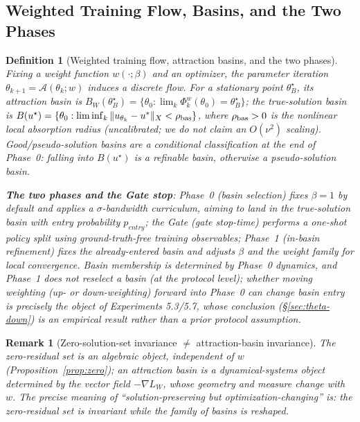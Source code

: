 \documentclass[11pt]{article}
\newcommand{\W}{W}
\newtheorem{definition}{Definition}[section]
\newtheorem*{remark}{Remark}
\numberwithin{equation}{section}
\begin{document}
\subsection{Weighted Training Flow, Basins, and the Two Phases}\label{sec:theta-flow}

\begin{definition}[Weighted training flow, attraction basins, and the two phases]\label{def:flow-basin}
Fixing a weight function $w(\cdot;\beta)$ and an optimizer, the parameter iteration $\theta_{k+1}=\mathcal A(\theta_k;w)$ induces a discrete flow. For a stationary point $\theta_B^\star$, its attraction basin is $B_{\W}(\theta_B^\star)=\{\theta_0:\lim_k\Phi_k^w(\theta_0)=\theta_B^\star\}$; the \emph{true-solution basin} is $B(u^\star)=\{\theta_0:\liminf_k\|u_{\theta_k}-u^*\|_X<\rho_{\rm bas}\}$, where $\rho_{\rm bas}>0$ is the nonlinear local absorption radius (uncalibrated; we do not claim an $O(\nu^2)$ scaling). Good/pseudo-solution basins are a conditional classification at the end of Phase~0: falling into $B(u^\star)$ is a refinable basin, otherwise a pseudo-solution basin.

\textbf{The two phases and the Gate stop}: \emph{Phase~0 (basin selection)} fixes $\beta=1$ by default and applies a $\sigma$-bandwidth curriculum, aiming to land in the true-solution basin with entry probability $p_{entry}$; the \emph{Gate (gate stop-time)} performs a one-shot policy split using ground-truth-free training observables; \emph{Phase~1 (in-basin refinement)} fixes the already-entered basin and adjusts $\beta$ and the weight family for local convergence. Basin membership is determined by Phase~0 dynamics, and Phase~1 does not reselect a basin (at the protocol level); whether moving weighting (up- or down-weighting) forward into Phase~0 can change basin entry is precisely the object of Experiments 5.3/5.7, whose conclusion (\S\ref{sec:theta-down}) is an empirical result rather than a prior protocol assumption.
\end{definition}

\begin{remark}[Zero-solution-set invariance $\ne$ attraction-basin invariance]\label{rem:attractor}
The zero-residual set is an algebraic object, independent of $w$ (Proposition~\ref{prop:zero}); an attraction basin is a dynamical-systems object determined by the vector field $-\nabla L_\W$, whose geometry and measure change with $w$. The precise meaning of ``solution-preserving but optimization-changing'' is: the zero-residual set is invariant while the family of basins is reshaped.
\end{remark}
\end{document}
